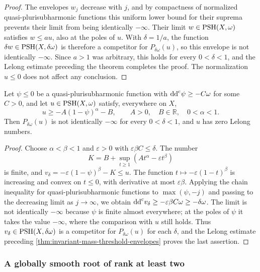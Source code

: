 \begin{proof}
The envelopes $w_j$ decrease with $j$, and by compactness of normalized quasi-plurisubharmonic functions this uniform lower bound for their suprema prevents their limit from being identically $-\infty$. Their limit $w\in\mathrm{PSH}(X,\omega)$ satisfies $w\leq au$, also at the poles of $u$. With $\delta=1/a$, the function $\delta w\in\mathrm{PSH}(X,\delta\omega)$ is therefore a competitor for $P_{\delta\omega}(u)$, so this envelope is not identically $-\infty$. Since $a>1$ was arbitrary, this holds for every $0<\delta<1$, and the Lelong estimate preceding the theorem completes the proof. The normalization $u\leq0$ does not affect any conclusion.
\end{proof}

\begin{proposition}\label{prop:sublinear-threshold-envelope}
Let $\psi\leq0$ be a quasi-plurisubharmonic function with $\mathrm{dd}^{\mathrm{c}}\psi\geq-C\omega$ for some $C>0$, and let $u\in\mathrm{PSH}(X,\omega)$ satisfy, everywhere on $X$,
\[
 u\geq-A(1-\psi)^\alpha-B,
 \qquad A>0,\quad B\in\mathbb R,\quad0<\alpha<1.
\]
Then $P_{\delta\omega}(u)$ is not identically $-\infty$ for every $0<\delta<1$, and $u$ has zero Lelong numbers.
\end{proposition}
\begin{proof}
Choose $\alpha<\beta<1$ and $\varepsilon>0$ with $\varepsilon\beta C\leq\delta$. The number
\[
 K=B+\sup_{t\geq1}(At^\alpha-\varepsilon t^\beta)
\]
is finite, and $v_\delta=-\varepsilon(1-\psi)^\beta-K\leq u$. The function $t\mapsto-\varepsilon(1-t)^\beta$ is increasing and convex on $t\leq0$, with derivative at most $\varepsilon\beta$. Applying the chain inequality for quasi-plurisubharmonic functions to $\max(\psi,-j)$ and passing to the decreasing limit as $j\to\infty$, we obtain $\mathrm{dd}^{\mathrm{c}} v_\delta\geq-\varepsilon\beta C\omega\geq-\delta\omega$. The limit is not identically $-\infty$ because $\psi$ is finite almost everywhere; at the poles of $\psi$ it takes the value $-\infty$, where the comparison with $u$ still holds. Thus $v_\delta\in\mathrm{PSH}(X,\delta\omega)$ is a competitor for $P_{\delta\omega}(u)$ for each $\delta$, and the Lelong estimate preceding \cref{thm:invariant-mass-threshold-envelopes} proves the last assertion.
\end{proof}

\subsubsection{A globally smooth root of rank at least two}

